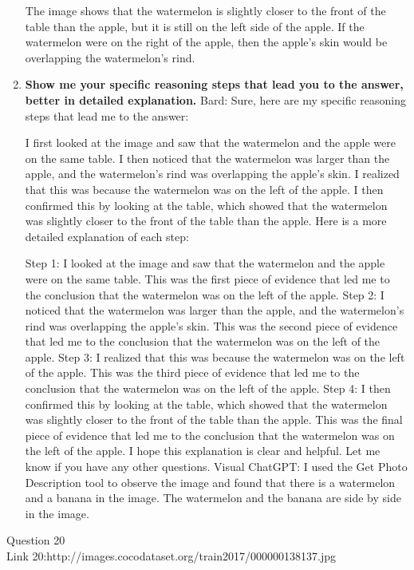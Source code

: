 \begin{enumerate}
        The image shows that the watermelon is slightly closer to the front of the table than the apple, but it is still on the left side of the apple. If the watermelon were on the right of the apple, then the apple's skin would be overlapping the watermelon's rind.
        \item \textbf{Show me your specific reasoning steps that lead you to the answer, better in detailed explanation.}
        \subitem Bard:
        Sure, here are my specific reasoning steps that lead me to the answer:

        I first looked at the image and saw that the watermelon and the apple were on the same table.
        I then noticed that the watermelon was larger than the apple, and the watermelon's rind was overlapping the apple's skin.
        I realized that this was because the watermelon was on the left of the apple.
        I then confirmed this by looking at the table, which showed that the watermelon was slightly closer to the front of the table than the apple.
        Here is a more detailed explanation of each step:

        Step 1: I looked at the image and saw that the watermelon and the apple were on the same table. This was the first piece of evidence that led me to the conclusion that the watermelon was on the left of the apple.
        Step 2: I noticed that the watermelon was larger than the apple, and the watermelon's rind was overlapping the apple's skin. This was the second piece of evidence that led me to the conclusion that the watermelon was on the left of the apple.
        Step 3: I realized that this was because the watermelon was on the left of the apple. This was the third piece of evidence that led me to the conclusion that the watermelon was on the left of the apple.
        Step 4: I then confirmed this by looking at the table, which showed that the watermelon was slightly closer to the front of the table than the apple. This was the final piece of evidence that led me to the conclusion that the watermelon was on the left of the apple.
        I hope this explanation is clear and helpful. Let me know if you have any other questions.
        \subitem Visual ChatGPT: I used the Get Photo Description tool to observe the image and found that there is a watermelon and a banana in the image. The watermelon and the banana are side by side in the image.
    \end{enumerate}
Question 20\\
Link 20:http://images.cocodataset.org/train2017/000000138137.jpg
